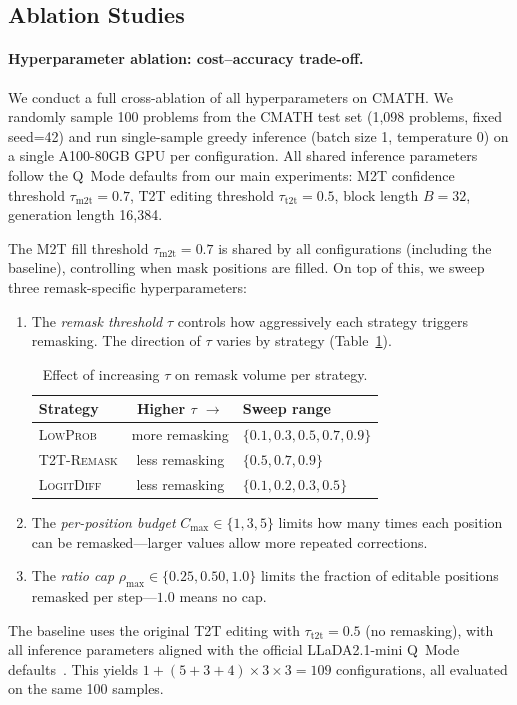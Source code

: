 \documentclass{article}
\begin{document}
\subsection{Ablation Studies}

\paragraph{Hyperparameter ablation: cost--accuracy trade-off.}
We conduct a full cross-ablation of all hyperparameters on CMATH. We randomly sample 100 problems from the CMATH test set (1,098 problems, fixed seed=42) and run single-sample greedy inference (batch size 1, temperature 0) on a single A100-80GB GPU per configuration. All shared inference parameters follow the Q~Mode defaults from our main experiments: M2T confidence threshold $\tau_{\text{m2t}}{=}0.7$, T2T editing threshold $\tau_{\text{t2t}}{=}0.5$, block length $B{=}32$, generation length 16,384.

The M2T fill threshold $\tau_{\text{m2t}}{=}0.7$ is shared by all configurations (including the baseline), controlling when mask positions are filled. On top of this, we sweep three remask-specific hyperparameters:
\begin{enumerate}[nosep,leftmargin=*]
    \item The \emph{remask threshold} $\tau$ controls how aggressively each strategy triggers remasking. The direction of $\tau$ varies by strategy (Table~\ref{tab:tau_dir}).
    \begin{table}[h]
    \centering\small
    \vspace{-2pt}
    \begin{tabular}{lcl}
    \toprule
    \textbf{Strategy} & \textbf{Higher $\tau$ $\to$} & \textbf{Sweep range} \\
    \midrule
    \textsc{LowProb}    & more remasking & $\{0.1, 0.3, 0.5, 0.7, 0.9\}$ \\
    \textsc{T2T-Remask} & less remasking & $\{0.5, 0.7, 0.9\}$ \\
    \textsc{LogitDiff}  & less remasking & $\{0.1, 0.2, 0.3, 0.5\}$ \\
    \bottomrule
    \end{tabular}
    \caption{Effect of increasing $\tau$ on remask volume per strategy.}
    \label{tab:tau_dir}
    \vspace{-6pt}
    \end{table}
    \item The \emph{per-position budget} $C_{\max} \in \{1, 3, 5\}$ limits how many times each position can be remasked---larger values allow more repeated corrections.
    \item The \emph{ratio cap} $\rho_{\max} \in \{0.25, 0.50, 1.0\}$ limits the fraction of editable positions remasked per step---$1.0$ means no cap.
\end{enumerate}
The baseline uses the original T2T editing with $\tau_{\text{t2t}}{=}0.5$ (no remasking), with all inference parameters aligned with the official LLaDA2.1-mini Q~Mode defaults~\citep{nie2026llada21}. This yields $1 + (5{+}3{+}4) \times 3 \times 3 = 109$ configurations, all evaluated on the same 100 samples.
\end{document}
